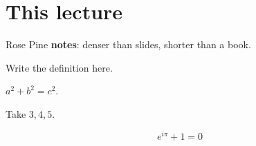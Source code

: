 \section{This lecture}

Rose Pine \textbf{notes}: denser than slides, shorter than a book.

\begin{definition}[Sample]
  Write the definition here.
\end{definition}

\begin{theorem}
  $a^2+b^2=c^2$.
\end{theorem}

\begin{example}
  Take $3,4,5$.
\end{example}

\begin{formulabox}
\[
  e^{i\pi}+1=0
\]
\end{formulabox}
